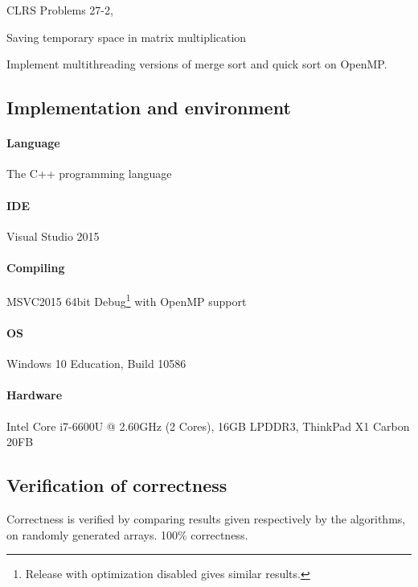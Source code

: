 \begin{homeworkProblem}

CLRS Problems 27-2,

Saving temporary space in matrix multiplication

\problemAnswer{
}
\end{homeworkProblem}





\begin{homeworkProblem}

Implement multithreading versions of merge sort and quick sort on OpenMP.

\subsection{Implementation and environment}
\paragraph{Language} The C++ programming language
\paragraph{IDE} Visual Studio 2015
\paragraph{Compiling} MSVC2015 64bit Debug\footnote{Release with optimization disabled gives similar results.} with OpenMP support
\paragraph{OS} Windows 10 Education, Build 10586
\paragraph{Hardware} Intel Core i7-6600U @ 2.60GHz (2 Cores), 16GB LPDDR3, ThinkPad X1 Carbon 20FB

\subsection{Verification of correctness}

Correctness is verified by comparing results given respectively by the algorithms, on randomly generated arrays. 100\% correctness.


\end{homeworkProblem}

